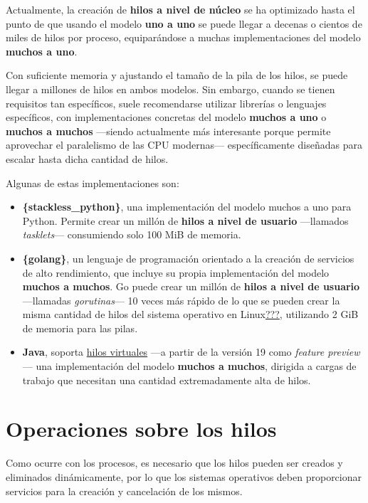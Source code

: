 Actualmente, la creación de \textbf{hilos a nivel de núcleo} se ha
optimizado hasta el punto de que usando el modelo \textbf{uno a uno} se
puede llegar a decenas o cientos de miles de hilos por proceso,
equiparándose a muchas implementaciones del modelo \textbf{muchos a
uno}.

Con suficiente memoria y ajustando el tamaño de la pila de los hilos, se
puede llegar a millones de hilos en ambos modelos. Sin embargo, cuando
se tienen requisitos tan específicos, suele recomendarse utilizar
librerías o lenguajes específicos, con implementaciones concretas del
modelo \textbf{muchos a uno} o \textbf{muchos a muchos} ---siendo
actualmente más interesante porque permite aprovechar el paralelismo de
las CPU modernas--- específicamente diseñadas para escalar hasta dicha
cantidad de hilos.

Algunas de estas implementaciones son:

\begin{itemize}
\item
  \textbf{\{stackless\_python\}}, una implementación del modelo muchos a
  uno para Python. Permite crear un millón de \textbf{hilos a nivel de
  usuario} ---llamados \emph{tasklets}--- consumiendo solo 100 MiB de
  memoria.
\item
  \textbf{\{golang\}}, un lenguaje de programación orientado a la
  creación de servicios de alto rendimiento, que incluye su propia
  implementación del modelo \textbf{muchos a muchos}. Go puede crear un
  millón de \textbf{hilos a nivel de usuario} ---llamadas
  \emph{gorutinas}--- 10 veces más rápido de lo que se pueden crear la
  misma cantidad de hilos del sistema operativo en
  Linux\hyperref[Hansen2023]{???}, utilizando 2 GiB de memoria para las
  pilas.
\item
  \textbf{Java}, soporta
  \href{https://blogs.oracle.com/javamagazine/post/java-loom-virtual-threads-platform-threads}{hilos
  virtuales} ---a partir de la versión 19 como \emph{feature preview}---
  una implementación del modelo \textbf{muchos a muchos}, dirigida a
  cargas de trabajo que necesitan una cantidad extremadamente alta de
  hilos.
\end{itemize}

\section{Operaciones sobre los
hilos}\label{_operaciones_sobre_los_hilos}

Como ocurre con los procesos, es necesario que los hilos pueden ser
creados y eliminados dinámicamente, por lo que los sistemas operativos
deben proporcionar servicios para la creación y cancelación de los
mismos.

